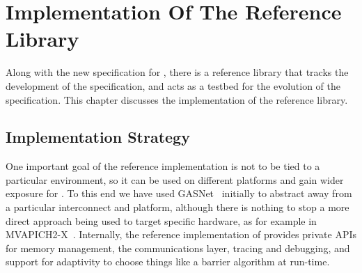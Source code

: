 %
% 
% 
% 
% 
% 
% 
%


\chapter{Implementation Of The Reference \openshmem Library}

Along with the new specification for \openshmem, there is a reference
library that tracks the development of the specification, and acts as
a testbed for the evolution of the specification.  This chapter
discusses the implementation of the reference library.

\section{Implementation Strategy}

One important goal of the reference implementation is not to be tied
to a particular environment, so it can be used on different platforms
and gain wider exposure for \openshmem.  To this end we have used
GASNet~\cite{gasnet} initially to abstract away from a particular
interconnect and platform, although there is nothing to stop a more
direct approach being used to target specific hardware, as for example
in MVAPICH2-X~\cite{mvapich2-x}.  Internally, the reference
implementation of \openshmem provides private APIs for memory
management, the communications layer, tracing and debugging, and
support for adaptivity to choose things like a barrier algorithm at
run-time.

